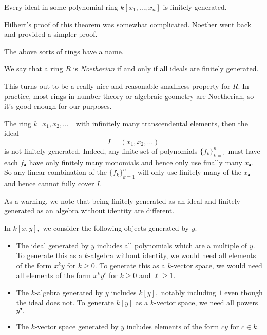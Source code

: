 \begin{theorem}
	Every ideal in some polynomial ring $k[x_1,\ldots,x_n]$ is finitely generated.
\end{theorem}
\begin{remark}
	Hilbert's proof of this theorem was somewhat complicated. Noether went back and provided a simpler proof.
\end{remark}
The above sorts of rings have a name.
\begin{definition}[Noetherian]
	We say that a ring $R$ is \textit{Noetherian} if and only if all ideals are finitely generated.
\end{definition}
This turns out to be a really nice and reasonable smallness property for $R.$ In practice, most rings in number theory or algebraic geometry are Noetherian, so it's good enough for our purposes.
\begin{nex}
	The ring $k[x_1,x_2,\ldots]$ with infinitely many transcendental elements, then the ideal
	\[I=(x_1,x_2,\ldots)\]
	is not finitely generated. Indeed, any finite set of polynomials $\{f_k\}_{k=1}^n$ must have each $f_\bullet$ have only finitely many monomials and hence only use finally many $x_\bullet.$ So any linear combination of the $\{f_k\}_{k=1}^n$ will only use finitely many of the $x_\bullet$ and hence cannot fully cover $I.$
\end{nex}
As a warning, we note that being finitely generated as an ideal and finitely generated as an algebra without identity are different.
\begin{ex}
	In $k[x,y],$ we consider the following objects generated by $y.$ 
	\begin{itemize}
		\item The ideal generated by $y$ includes all polynomials which are a multiple of $y.$ To generate this as a $k$-algebra without identity, we would need all elements of the form $x^ky$ for $k\ge0.$ To generate this as a $k$-vector space, we would need all elements of the form $x^ky^\ell$ for $k\ge0$ and $\ell\ge1.$
		\item The $k$-algebra generated by $y$ includes $k[y],$ notably including $1$ even though the ideal does not. To generate $k[y]$ as a $k$-vector space, we need all powers $y^\bullet.$
		\item The $k$-vector space generated by $y$ includes elements of the form $cy$ for $c\in k.$
	\end{itemize}
\end{ex}

